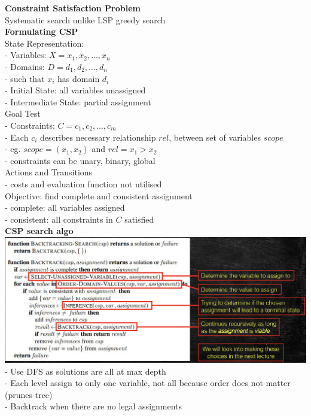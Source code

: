 \documentclass[10pt, a4paper]{article}
\newcommand{\red}[1]{{\color{red}#1}}
\newcommand{\green}[1]{{\color{ForestGreen}#1}}
\newcommand{\header}[1]{{\normalsize\textbf{#1}}}
\newcommand{\tab}[0]{\hspace*{2mm}}
\begin{document}
\begin{multicols*}{3}
	  \header{Constraint Satisfaction Problem}\\
	  Systematic search unlike LSP greedy search\\
	  \textbf{Formulating CSP}\\
	  State Representation:\\
	  - Variables: $X = {x_{1}, x_{2}, ... , x_{n}}$\\
	  - Domains: $D = {d_{1}, d_{2}, ... , d_{n}}$\\
	  \tab - such that $x_{i}$ has domain $d_{i}$\\
	  - Initial State: all variables unassigned\\
	  - Intermediate State: partial assignment\\
	  Goal Test\\
	  - Constraints: $C = {c_{1}, c_{2}, ... , c_{m}}$\\
	  - Each $c_{i}$ describes necessary relationship $rel$, between set of variables $scope$\\
	  \tab - eg. $scope = (x_{1}, x_{2})$ and $rel = x_{1} > x_{2}$\\
	  - constraints can be \red{unary, binary, global}\\
	  Actions and Transitions\\
	  - costs and evaluation function not utilised\\

	  Objective: find \green{complete} and \green{consistent} assignment\\
	  - complete: all variables assigned\\
	  - consistent: all constraints in $C$ satisfied\\

	  \textbf{CSP search algo}\\
	  \includegraphics[scale=0.135]{./assets/CspBacktracking.jpeg}\\
	  - Use DFS as solutions \green{are all at} max depth\\
	  - Each level assign to only \green{one variable}, \red{not all} because order does not matter (prunes tree)\\
	  - Backtrack when there are no legal assignments\\

	  









	\end{multicols*}
\end{document}
